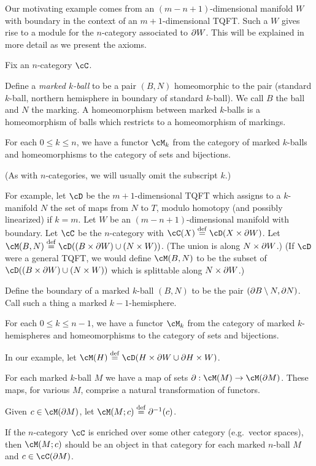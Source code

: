 Our motivating example comes from an $(m{-}n{+}1)$-dimensional manifold $W$ with boundary
in the context of an $m{+}1$-dimensional TQFT.
Such a $W$ gives rise to a module for the $n$-category associated to $\partial W$.
This will be explained in more detail as we present the axioms.

Fix an $n$-category $\cC$.

Define a {\it marked $k$-ball} to be a pair $(B, N)$ homeomorphic to the pair
(standard $k$-ball, northern hemisphere in boundary of standard $k$-ball).
We call $B$ the ball and $N$ the marking.
A homeomorphism between marked $k$-balls is a homeomorphism of balls which
restricts to a homeomorphism of markings.

{For each $0 \le k \le n$, we have a functor $\cM_k$ from 
the category of marked $k$-balls and 
homeomorphisms to the category of sets and bijections.}

(As with $n$-categories, we will usually omit the subscript $k$.)

For example, let $\cD$ be the $m{+}1$-dimensional TQFT which assigns to a $k$-manifold $N$ the set 
of maps from $N$ to $T$, modulo homotopy (and possibly linearized) if $k=m$.
Let $W$ be an $(m{-}n{+}1)$-dimensional manifold with boundary.
Let $\cC$ be the $n$-category with $\cC(X) \deq \cD(X\times \bd W)$.
Let $\cM(B, N) \deq \cD((B\times \bd W)\cup (N\times W))$.
(The union is along $N\times \partial W$.)
(If $\cD$ were a general TQFT, we would define $\cM(B, N)$ to be
the subset of $\cD((B\times \bd W)\cup (N\times W))$ which is splittable along $N\times \partial W$.)

Define the boundary of a marked $k$-ball $(B, N)$ to be the pair $(\partial B \setminus N, \partial N)$.
Call such a thing a {marked $k{-}1$-hemisphere}.

{For each $0 \le k \le n-1$, we have a functor $\cM_k$ from 
the category of marked $k$-hemispheres and 
homeomorphisms to the category of sets and bijections.}

In our example, let $\cM(H) \deq \cD(H\times\bd W \cup \bd H\times W)$.

{For each marked $k$-ball $M$ we have a map of sets $\bd: \cM(M)\to \cM(\bd M)$.
These maps, for various $M$, comprise a natural transformation of functors.}

Given $c\in\cM(\bd M)$, let $\cM(M; c) \deq \bd^{-1}(c)$.

If the $n$-category $\cC$ is enriched over some other category (e.g.\ vector spaces),
then $\cM(M; c)$ should be an object in that category for each marked $n$-ball $M$
and $c\in \cC(\bd M)$.

